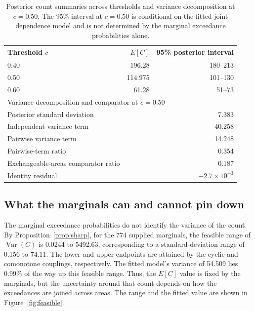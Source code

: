 \begin{table}[htbp]
  \centering
  \caption{Posterior count summaries across thresholds and variance decomposition at \(c=0.50\). The 95\% interval at \(c=0.50\) is conditional on the fitted joint dependence model and is not determined by the marginal exceedance probabilities alone.}
  \label{tab:count}
  \begin{tabular}{lrr}
    \toprule
    Threshold \(c\) & \(E[C]\) & 95\% posterior interval \\
    \midrule
    0.40 & 196.28 & 180--213 \\
    0.50 & 114.975 & 101--130 \\
    0.60 & 61.28 & 51--73 \\
    \midrule
    \multicolumn{3}{l}{Variance decomposition and comparator at \(c=0.50\)} \\
    Posterior standard deviation & \multicolumn{2}{r}{7.383} \\
    Independent variance term & \multicolumn{2}{r}{40.258} \\
    Pairwise variance term & \multicolumn{2}{r}{14.248} \\
    Pairwise-term ratio & \multicolumn{2}{r}{0.354} \\
    Exchangeable-areas comparator ratio & \multicolumn{2}{r}{0.187} \\
    Identity residual & \multicolumn{2}{r}{\(-2.7\times 10^{-3}\)} \\
    \bottomrule
  \end{tabular}
\end{table}

\subsection{What the marginals can and cannot pin down}

The marginal exceedance probabilities do not identify the variance of the count. By Proposition~\ref{prop:sharp}, for the 774 supplied marginals, the feasible range of \(\operatorname{Var}(C)\) is 0.0244 to 5492.63, corresponding to a standard-deviation range of 0.156 to 74.11. The lower and upper endpoints are attained by the cyclic and comonotone couplings, respectively. The fitted model's variance of 54.509 lies 0.99\% of the way up this feasible range. Thus, the \(E[C]\) value is fixed by the marginals, but the uncertainty around that count depends on how the exceedances are joined across areas. The range and the fitted value are shown in Figure~\ref{fig:feasible}.

